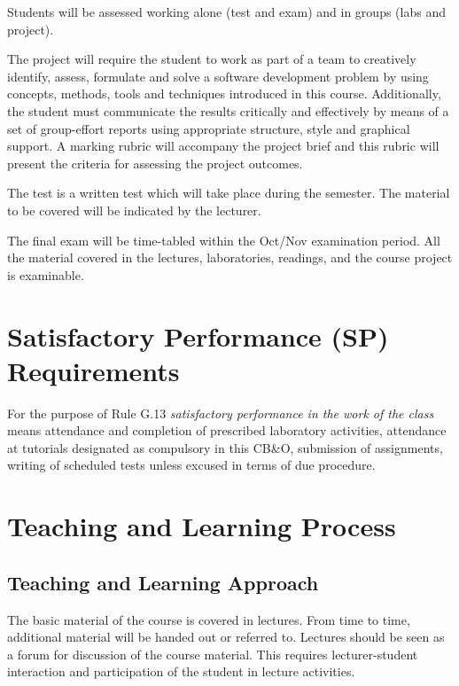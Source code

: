 \documentclass[11pt]{eie-cbo}
\begin{document}
Students will be assessed working alone (test and exam) and in groups (labs and project). 

The project will require the student to work as part of a team to creatively identify, assess, formulate and solve a software development problem by using concepts, methods, tools and techniques introduced in this course. Additionally, the student must communicate the results critically and effectively by means of a set of group-effort reports using appropriate structure, style and graphical support. A marking rubric will accompany the project brief and this rubric will present the criteria for assessing the project outcomes. 

The test is a written test which will take place during the semester. The material to be covered will be indicated by the lecturer.

The final exam will be time-tabled within the Oct/Nov examination period. All the material covered in the lectures, laboratories, readings, and the course project is examinable. 

\section{Satisfactory Performance (SP) Requirements}\label{SP}
For the purpose of Rule G.13 \emph{satisfactory performance in the work of the class} means attendance and completion of prescribed laboratory activities, attendance at tutorials designated as compulsory in this CB\&O, submission of assignments, writing of scheduled tests unless excused in terms of due procedure.  

\section{Teaching and Learning Process}\label{teaching}
\subsection{Teaching and Learning Approach}
The basic material of the course is covered in lectures. From time to time,
additional material will be handed out or referred to. Lectures should be seen
as a forum for discussion of the course material. This requires
lecturer-student interaction and participation of the student in lecture
activities.
\end{document}
